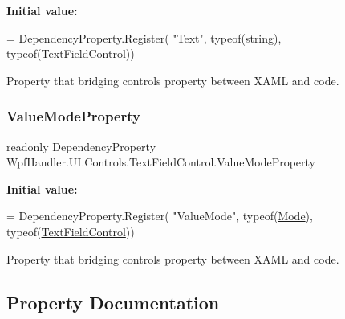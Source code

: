 {\bfseries Initial value\+:}
\begin{DoxyCode}
= DependencyProperty.Register(
          \textcolor{stringliteral}{"Text"}, typeof(\textcolor{keywordtype}{string}), typeof(\mbox{\hyperlink{class_wpf_handler_1_1_u_i_1_1_controls_1_1_text_field_control_a90ff02e9ee1b2b63d034a3376594ddf4}{TextFieldControl}}))
\end{DoxyCode}


Property that bridging control\textquotesingle{}s property between X\+A\+ML and code. 

\mbox{\label{class_wpf_handler_1_1_u_i_1_1_controls_1_1_text_field_control_a062dfc30849f6fff2dee9ea75ab272ef}} 
\subsubsection{\texorpdfstring{Value\+Mode\+Property}{ValueModeProperty}}
{\footnotesize\ttfamily readonly Dependency\+Property Wpf\+Handler.\+U\+I.\+Controls.\+Text\+Field\+Control.\+Value\+Mode\+Property\hspace{0.3cm}{\ttfamily [static]}}

{\bfseries Initial value\+:}
\begin{DoxyCode}
= DependencyProperty.Register(
          \textcolor{stringliteral}{"ValueMode"}, typeof(\mbox{\hyperlink{class_wpf_handler_1_1_u_i_1_1_controls_1_1_text_field_control_a99939f3d8500812661376afa5ee1a31d}{Mode}}), typeof(\mbox{\hyperlink{class_wpf_handler_1_1_u_i_1_1_controls_1_1_text_field_control_a90ff02e9ee1b2b63d034a3376594ddf4}{TextFieldControl}}))
\end{DoxyCode}


Property that bridging control\textquotesingle{}s property between X\+A\+ML and code. 



\subsection{Property Documentation}
\mbox{\label{class_wpf_handler_1_1_u_i_1_1_controls_1_1_text_field_control_ab4b06ba1470f467c920ad28f100a4ae2}} 
